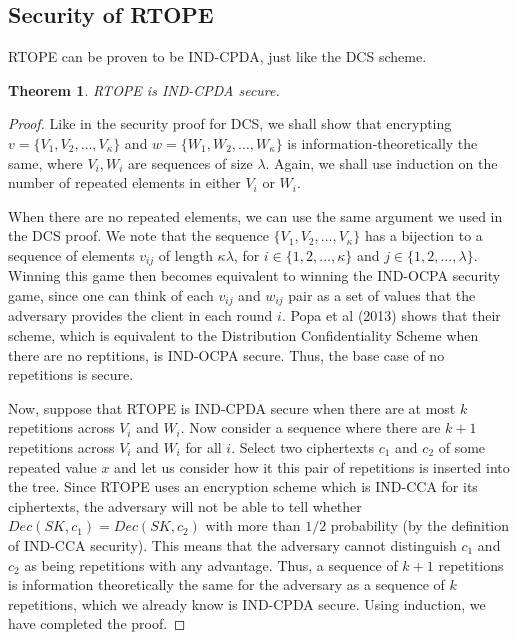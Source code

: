 \documentclass[12pt]{article}
\newtheorem{theorem}{Theorem}[section]
\begin{document}
  \subsection{Security of RTOPE}

  RTOPE can be proven to be IND-CPDA, just like the DCS scheme.

  \begin{theorem}
    RTOPE is IND-CPDA secure.
  \end{theorem}
  \begin{proof}
    Like in the security proof for DCS, we shall show that encrypting $v = \{V_1, V_2, \ldots, V_{\kappa} \}$ and $w = \{W_1, W_2, \ldots, W_{\kappa}\}$ is information-theoretically the same, where $V_i, W_i$ are sequences of size $\lambda$. Again, we shall use induction on the number of repeated elements in either $V_i$ or $W_i$. 

    When there are no repeated elements, we can use the same argument we used in the DCS proof. We note that the sequence $\{V_1, V_2, \ldots, V_{\kappa} \}$ has a bijection to a sequence of elements $v_{ij}$ of length $\kappa \lambda$, for $i \in \{1, 2, \ldots, \kappa\}$ and $j \in \{1, 2, \ldots, \lambda \}$. Winning this game then becomes equivalent to winning the IND-OCPA security game, since one can think of each $v_{ij}$ and $w_{ij}$ pair as a set of values that the adversary provides the client in each round $i$. Popa et al (2013) shows that their scheme, which is equivalent to the Distribution Confidentiality Scheme when there are no reptitions, is IND-OCPA secure. Thus, the base case of no repetitions is secure.

    Now, suppose that RTOPE is IND-CPDA secure when there are at most $k$ repetitions across $V_i$ and $W_i$. Now consider a sequence where there are $k+1$ repetitions across $V_i$ and $W_i$ for all $i$. Select two ciphertexts $c_1$ and $c_2$ of some repeated value $x$ and let us consider how it this pair of repetitions is inserted into the tree. Since RTOPE uses an encryption scheme which is IND-CCA for its ciphertexts, the adversary will not be able to tell whether $Dec(SK, c_1) = Dec(SK, c_2)$ with more than $1/2$ probability (by the definition of IND-CCA security). This means that the adversary cannot distinguish $c_1$ and $c_2$ as being repetitions with any advantage. Thus, a sequence of $k+1$ repetitions is information theoretically the same for the adversary as a sequence of $k$ repetitions, which we already know is IND-CPDA secure. Using induction, we have completed the proof.  
  \end{proof}
\end{document}
